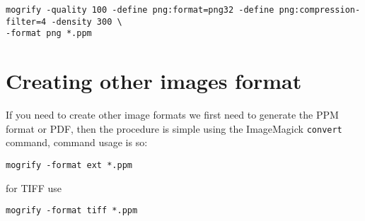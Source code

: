 \documentclass[11pt]{article}
\begin{document}
\begin{lstlisting}
mogrify -quality 100 -define png:format=png32 -define png:compression-filter=4 -density 300 \
-format png *.ppm
\end{lstlisting}


\section{Creating other images format}
If you need to create other image formats we first need to generate the PPM format or PDF, then the procedure is simple
using the \textsf{ImageMagick} \texttt{convert} command, command usage is so:
\begin{lstlisting}
mogrify -format ext *.ppm
\end{lstlisting}
for TIFF use  
\begin{lstlisting}
mogrify -format tiff *.ppm
\end{lstlisting}
\end{document}
